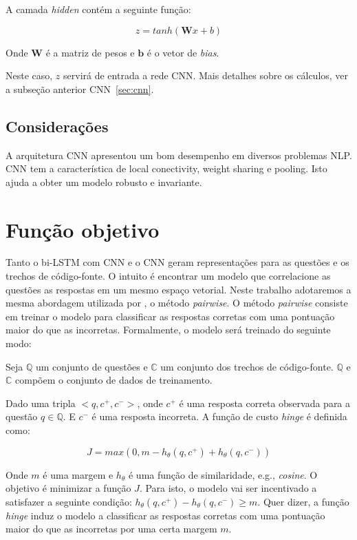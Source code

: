 A camada \textit{hidden} contém a seguinte função:

\begin{equation}
z = tanh(\bm{W}x + b)
\end{equation}

Onde $\bm{W}$ é a matriz de pesos e $\bm{b}$ é o vetor de \textit{bias}.

Neste caso, $z$ servirá de entrada a rede CNN. Mais detalhes sobre os cálculos, ver a subseção anterior CNN~\ref{sec:cnn}.

\subsection{Considerações}

A arquitetura CNN apresentou um bom desempenho em diversos problemas NLP. CNN tem a característica de local conectivity, weight sharing e pooling. Isto ajuda a obter um modelo robusto e invariante. 

\section{Função objetivo}

Tanto o bi-LSTM com CNN e o CNN geram representações para as questões e os trechos de código-fonte. O intuito é encontrar um modelo que correlacione as questões as respostas em um mesmo espaço vetorial. Neste trabalho adotaremos a mesma abordagem utilizada por \cite{feng-2015}, o método \textit{pairwise}. O método \textit{pairwise} consiste em treinar o modelo para classificar as respostas corretas com uma pontuação maior do que as incorretas. Formalmente, o modelo será treinado do seguinte modo:

Seja $\mathbb{Q}$ um conjunto de questões e $\mathbb{C}$ um conjunto dos trechos de código-fonte. $\mathbb{Q}$ e $\mathbb{C}$ compõem o conjunto de dados de treinamento.

Dado uma tripla $<q, c^{+}, c^{-}>$, onde $c^{+}$ é uma resposta correta observada para a questão $q \in \mathbb{Q}$. E $c^{-}$ é uma resposta incorreta. A função de custo \textit{hinge} é definida como:

\begin{equation}
J = max(0, m - h_{\theta}(q, c^{+}) + h_{\theta}(q, c^{-}))
\end{equation}

Onde $m$ é uma margem e $h_{\theta}$ é uma função de similaridade, e.g., \textit{cosine}. O objetivo é minimizar a função $J$. Para isto, o modelo vai ser incentivado a satisfazer a seguinte condição: $h_{\theta}(q, c^{+}) - h_{\theta}(q, c^{-}) \geq m$. Quer dizer, a função \textit{hinge} induz o modelo a classificar as respostas corretas com uma pontuação maior do que as incorretas por uma certa margem $m$.